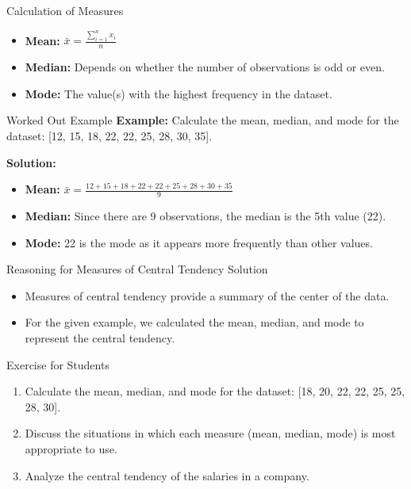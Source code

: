 \begin{frame}{Calculation of Measures}
  \begin{itemize}
    \item \textbf{Mean:} \( \bar{x} = \frac{\sum_{i=1}^{n} x_i}{n} \)
    \item \textbf{Median:} Depends on whether the number of observations is odd or even.
    \item \textbf{Mode:} The value(s) with the highest frequency in the dataset.
  \end{itemize}
\end{frame}

\begin{frame}{Worked Out Example}
  \textbf{Example:} Calculate the mean, median, and mode for the dataset: [12, 15, 18, 22, 22, 25, 28, 30, 35].

  \textbf{Solution:}
  \begin{itemize}
    \item \textbf{Mean:} \( \bar{x} = \frac{12 + 15 + 18 + 22 + 22 + 25 + 28 + 30 + 35}{9} \)
    \item \textbf{Median:} Since there are 9 observations, the median is the 5th value (22).
    \item \textbf{Mode:} 22 is the mode as it appears more frequently than other values.
  \end{itemize}
\end{frame}

\begin{frame}{Reasoning for Measures of Central Tendency Solution}
  \begin{itemize}
    \item Measures of central tendency provide a summary of the center of the data.
    \item For the given example, we calculated the mean, median, and mode to represent the central tendency.
  \end{itemize}
\end{frame}

\begin{frame}{Exercise for Students}
  \begin{enumerate}
    \item Calculate the mean, median, and mode for the dataset: [18, 20, 22, 22, 25, 25, 28, 30].
    \item Discuss the situations in which each measure (mean, median, mode) is most appropriate to use.
    \item Analyze the central tendency of the salaries in a company.
  \end{enumerate}
\end{frame}

